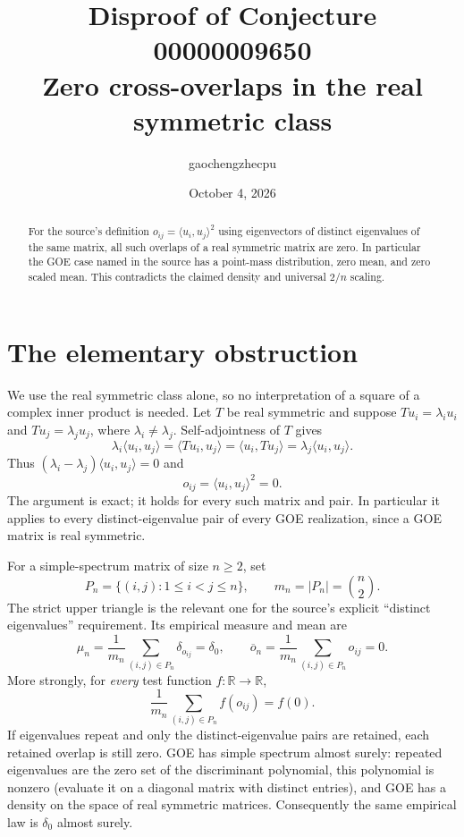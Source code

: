 \documentclass[11pt]{article}
\title{Disproof of Conjecture 00000009650\\\large Zero cross-overlaps in the real symmetric class}
\author{gaochengzhecpu}
\date{October 4, 2026}
\begin{document}
\maketitle
\begin{abstract}
For the source's definition $o_{ij}=\langle u_i,u_j\rangle^2$ using
eigenvectors of distinct eigenvalues of the same matrix, all such overlaps
of a real symmetric matrix are zero. In particular the GOE case named in
the source has a point-mass distribution, zero mean, and zero scaled mean.
This contradicts the claimed density and universal $2/n$ scaling.
\end{abstract}

\section*{The elementary obstruction}
We use the real symmetric class alone, so no interpretation of a square of
a complex inner product is needed. Let $T$ be real symmetric and suppose
$Tu_i=\lambda_i u_i$ and $Tu_j=\lambda_j u_j$, where $\lambda_i\ne\lambda_j$.
Self-adjointness of $T$ gives
\[
 \lambda_i\langle u_i,u_j\rangle
 =\langle Tu_i,u_j\rangle
 =\langle u_i,Tu_j\rangle
 =\lambda_j\langle u_i,u_j\rangle.
\]
Thus $(\lambda_i-\lambda_j)\langle u_i,u_j\rangle=0$ and
\[
                       o_{ij}=\langle u_i,u_j\rangle^2=0.
\]
The argument is exact; it holds for every such matrix and pair. In
particular it applies to every distinct-eigenvalue pair of every GOE
realization, since a GOE matrix is real symmetric.

For a simple-spectrum matrix of size $n\geq2$, set
\[
 P_n=\{(i,j):1\leq i<j\leq n\},\qquad m_n=|P_n|=\binom n2.
\]
The strict upper triangle is the relevant one for the source's explicit
``distinct eigenvalues'' requirement. Its empirical measure and mean are
\[
 \mu_n=\frac1{m_n}\sum_{(i,j)\in P_n}\delta_{o_{ij}}=\delta_0,
 \qquad
 \overline o_n=\frac1{m_n}\sum_{(i,j)\in P_n}o_{ij}=0.
\]
More strongly, for \emph{every} test function $f:\mathbb R\to\mathbb R$,
\[
             \frac1{m_n}\sum_{(i,j)\in P_n}f(o_{ij})=f(0).
\]
If eigenvalues repeat and only the distinct-eigenvalue pairs are retained,
each retained overlap is still zero. GOE has simple spectrum almost surely:
repeated eigenvalues are the zero set of the discriminant polynomial, this
polynomial is nonzero (evaluate it on a diagonal matrix with distinct
entries), and GOE has a density on the space of real symmetric matrices.
Consequently the same empirical law is $\delta_0$ almost surely.
\end{document}
